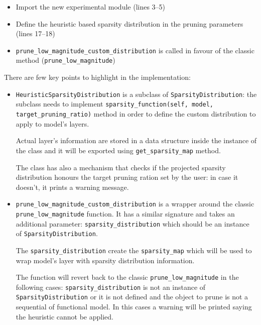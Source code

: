 \begin{itemize}
    \item Import the new experimental module (lines 3--5)
    \item Define the heuristic based sparsity distribution in the pruning
        parameters (lines 17--18)
    \item \texttt{prune\_low\_magnitude\_custom\_distribution} is called in
        favour of the classic method (\texttt{prune\_low\_magnitude})
\end{itemize}

There are few key points to highlight in the implementation:

\begin{itemize}
    \item \texttt{HeuristicSparsityDistribution} is a subclass of \linebreak
        \texttt{SparsityDistribution}: the subclass needs to implement
        \linebreak
        \texttt{sparsity\_function\string(self, model, target\_pruning\_ratio\string)}
        method in order to define the custom distribution to apply to model's
        layers.

        Actual layer's information are stored in a data structure inside the
        instance of the class and it will be exported using
        \texttt{get\_sparsity\_map} method.

        The class has also a mechanism that checks if the projected sparsity
        distribution honours the target pruning ration set by the user: in case
        it doesn't, it prints a warning message.
    \item \texttt{prune\_low\_magnitude\_custom\_distribution} is a wrapper
        around the classic \texttt{prune\_low\_magnitude} function. It has a
        similar signature and takes an additional parameter:
        \texttt{sparsity\_distribution} which should be an instance of
        \texttt{SparsityDistribution}.

        The \texttt{sparsity\_distribution} create the \texttt{sparsity\_map}
        which will be used to wrap model's layer with sparsity distribution
        information.

        The function will revert back to the classic
        \texttt{prune\_low\_magnitude} in the following cases:
        \texttt{sparsity\_distribution} is not an instance of \linebreak
        \texttt{SparsityDistribution} or it is not defined and the object to
        prune is not a sequential of functional model. In this cases a warning
        will be printed saying the heuristic cannot be applied.
\end{itemize}

